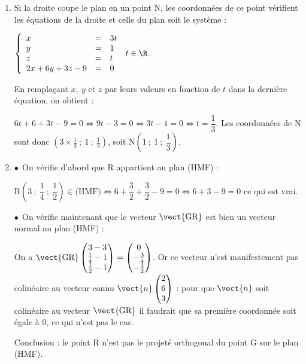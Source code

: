 \begin{enumerate}
$X(x~;~y~;~z) \in  (\text{DG}) \iff \vect{\text{DX}} = t\vect{\text{DG}}, \: t \in \R \iff \left\{\begin{array}{l c l}
x - 0&=&3t\\y - 1&=&0\\z - 0 &=& 1t\end{array}\right.\: t \in \R \iff \left\{\begin{array}{l c l}
x &=&3t\\y &=&1\\z  &=& t\end{array}\right.\: t \in \R$.
\item 


Si la droite coupe le plan en un point N, les coordonnées de ce point vérifient les équations de la droite et celle du plan soit le système :

$\left\{\begin{array}{l c l}
x &=&3t\\y &=&1\\z  &=& t\\
2x + 6y + 3z - 9 &= &0
\end{array}\right.\: t \in \R$.

En remplaçant $x,\:y$ et $z$ par leurs valeurs en fonction de $t$ dans la dernière équation, on obtient :

$6t + 6 + 3t - 9 = 0 \iff 9t - 3 = 0 \iff 3t - 1 = 0 \iff t = \dfrac 13$.
Les coordonnées de N sont donc $\left(3\times \frac13~;~1~;~\frac13\right)$, soit 
N$\left(1~;~1~;~\dfrac13\right)$.
\item 
$\bullet~~$On vérifie d'abord que R appartient au plan (HMF) :

$\text{R}\left(3~;~\dfrac{1}{4}~;~\dfrac{1}{2}\right) \in \text{(HMF)} \iff 6 + \dfrac32 + \dfrac32 - 9 = 0 \iff 6 + 3 - 9 = 0$ ce qui est vrai.

$\bullet~~$On vérifie maintenant que le vecteur $\vect{\text{GR}}$ est bien un vecteur normal au plan (HMF) :

On a $\vect{\text{GR}}\begin{pmatrix}3 - 3\\ \frac14 - 1\\ \frac12 - 1\end{pmatrix} = \begin{pmatrix}0\\- \frac34\\- \frac12\end{pmatrix}$.
Or ce vecteur n'est manifestement pas colinéaire au vecteur connu $\vect{n}\begin{pmatrix}2\\6\\3\end{pmatrix}$ : pour que $\vect{n}$ soit colinéaire au vecteur $\vect{\text{GR}}$ il faudrait que sa première coordonnée soit égale à 0, ce qui n'est pas le cas.

Conclusion : le point R n'est pas le projeté orthogonal du point G sur le plan (HMF).
\end{enumerate}
